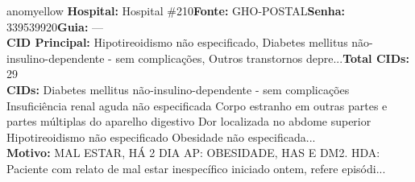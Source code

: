 \documentclass[a4paper,10pt]{article}
\begin{document}
\begin{anomalycard}[Interna\c{c}\~{a}o \#11175 | Pac. \#11795 | MODERADO (z=2.69) | LOS: 8d | 25/02/2026\,$\to$\,05/03/2026]{anomyellow}
\textbf{Hospital:} Hospital \#210\quad \textbf{Fonte:} GHO-POSTAL\quad \textbf{Senha:} 339539920\quad \textbf{Guia:} ---\\

\textbf{CID Principal:} {\small Hipotireoidismo não especificado, Diabetes mellitus não-insulino-dependente - sem complicações, Outros transtornos depre...}\quad\textbf{Total CIDs:} 29\\

\textbf{CIDs:} {\scriptsize Diabetes mellitus não-insulino-dependente - sem complicações \textbar{} Insuficiência renal aguda não especificada \textbar{} Corpo estranho em outras partes e partes múltiplas do aparelho digestivo \textbar{} Dor localizada no abdome superior \textbar{} Hipotireoidismo não especificado \textbar{} Obesidade não especificada...}\\

\textbf{Motivo:} {\scriptsize MAL ESTAR, HÁ 2 DIA AP: OBESIDADE, HAS E DM2. HDA:  Paciente com relato de mal estar inespecífico iniciado ontem, refere episódi...}\\




\end{anomalycard}
\end{document}
